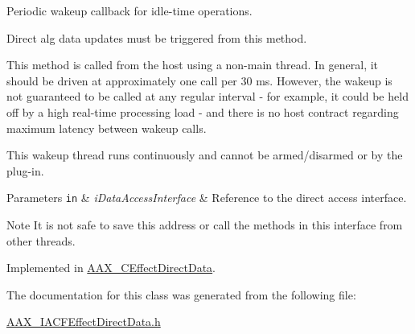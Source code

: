 Periodic wakeup callback for idle-\/time operations. 

Direct alg data updates must be triggered from this method.

This method is called from the host using a non-\/main thread. In general, it should be driven at approximately one call per 30 ms. However, the wakeup is not guaranteed to be called at any regular interval -\/ for example, it could be held off by a high real-\/time processing load -\/ and there is no host contract regarding maximum latency between wakeup calls.

This wakeup thread runs continuously and cannot be armed/disarmed or by the plug-\/in.


\begin{DoxyParams}[1]{Parameters}
\mbox{\tt in}  & {\em i\+Data\+Access\+Interface} & Reference to the direct access interface.\\
\hline
\end{DoxyParams}
\begin{DoxyNote}{Note}
It is not safe to save this address or call the methods in this interface from other threads. 
\end{DoxyNote}


Implemented in \hyperlink{a00016_a3ed665cfbece195524e208e61b4d1937}{A\+A\+X\+\_\+\+C\+Effect\+Direct\+Data}.



The documentation for this class was generated from the following file\+:\begin{DoxyCompactItemize}
\item 
\hyperlink{a00222}{A\+A\+X\+\_\+\+I\+A\+C\+F\+Effect\+Direct\+Data.\+h}\end{DoxyCompactItemize}
